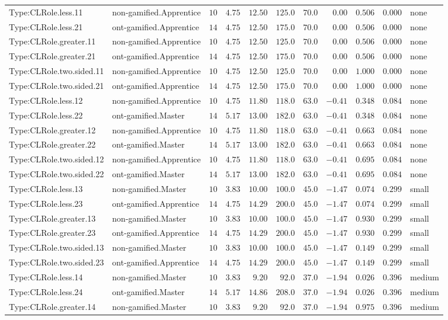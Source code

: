 \documentclass[6pt,a4paper]{article}
\begin{document}
{\begin{longtable}{llrrrrrrrrl}
Type:CLRole.less.11&non-gamified.Apprentice&$10$&$4.75$&$12.50$&$125.0$&$ 70.0$&$ 0.00$&$0.506$&$0.000$&none\tabularnewline
Type:CLRole.less.21&ont-gamified.Apprentice&$14$&$4.75$&$12.50$&$175.0$&$ 70.0$&$ 0.00$&$0.506$&$0.000$&none\tabularnewline
Type:CLRole.greater.11&non-gamified.Apprentice&$10$&$4.75$&$12.50$&$125.0$&$ 70.0$&$ 0.00$&$0.506$&$0.000$&none\tabularnewline
Type:CLRole.greater.21&ont-gamified.Apprentice&$14$&$4.75$&$12.50$&$175.0$&$ 70.0$&$ 0.00$&$0.506$&$0.000$&none\tabularnewline
Type:CLRole.two.sided.11&non-gamified.Apprentice&$10$&$4.75$&$12.50$&$125.0$&$ 70.0$&$ 0.00$&$1.000$&$0.000$&none\tabularnewline
Type:CLRole.two.sided.21&ont-gamified.Apprentice&$14$&$4.75$&$12.50$&$175.0$&$ 70.0$&$ 0.00$&$1.000$&$0.000$&none\tabularnewline
Type:CLRole.less.12&non-gamified.Apprentice&$10$&$4.75$&$11.80$&$118.0$&$ 63.0$&$-0.41$&$0.348$&$0.084$&none\tabularnewline
Type:CLRole.less.22&ont-gamified.Master&$14$&$5.17$&$13.00$&$182.0$&$ 63.0$&$-0.41$&$0.348$&$0.084$&none\tabularnewline
Type:CLRole.greater.12&non-gamified.Apprentice&$10$&$4.75$&$11.80$&$118.0$&$ 63.0$&$-0.41$&$0.663$&$0.084$&none\tabularnewline
Type:CLRole.greater.22&ont-gamified.Master&$14$&$5.17$&$13.00$&$182.0$&$ 63.0$&$-0.41$&$0.663$&$0.084$&none\tabularnewline
Type:CLRole.two.sided.12&non-gamified.Apprentice&$10$&$4.75$&$11.80$&$118.0$&$ 63.0$&$-0.41$&$0.695$&$0.084$&none\tabularnewline
Type:CLRole.two.sided.22&ont-gamified.Master&$14$&$5.17$&$13.00$&$182.0$&$ 63.0$&$-0.41$&$0.695$&$0.084$&none\tabularnewline
Type:CLRole.less.13&non-gamified.Master&$10$&$3.83$&$10.00$&$100.0$&$ 45.0$&$-1.47$&$0.074$&$0.299$&small\tabularnewline
Type:CLRole.less.23&ont-gamified.Apprentice&$14$&$4.75$&$14.29$&$200.0$&$ 45.0$&$-1.47$&$0.074$&$0.299$&small\tabularnewline
Type:CLRole.greater.13&non-gamified.Master&$10$&$3.83$&$10.00$&$100.0$&$ 45.0$&$-1.47$&$0.930$&$0.299$&small\tabularnewline
Type:CLRole.greater.23&ont-gamified.Apprentice&$14$&$4.75$&$14.29$&$200.0$&$ 45.0$&$-1.47$&$0.930$&$0.299$&small\tabularnewline
Type:CLRole.two.sided.13&non-gamified.Master&$10$&$3.83$&$10.00$&$100.0$&$ 45.0$&$-1.47$&$0.149$&$0.299$&small\tabularnewline
Type:CLRole.two.sided.23&ont-gamified.Apprentice&$14$&$4.75$&$14.29$&$200.0$&$ 45.0$&$-1.47$&$0.149$&$0.299$&small\tabularnewline
Type:CLRole.less.14&non-gamified.Master&$10$&$3.83$&$ 9.20$&$ 92.0$&$ 37.0$&$-1.94$&$0.026$&$0.396$&medium\tabularnewline
Type:CLRole.less.24&ont-gamified.Master&$14$&$5.17$&$14.86$&$208.0$&$ 37.0$&$-1.94$&$0.026$&$0.396$&medium\tabularnewline
Type:CLRole.greater.14&non-gamified.Master&$10$&$3.83$&$ 9.20$&$ 92.0$&$ 37.0$&$-1.94$&$0.975$&$0.396$&medium\tabularnewline

\end{longtable}}
\end{document}
